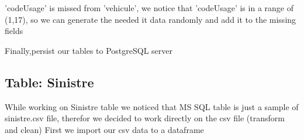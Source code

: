 'codeUsage' is missed from 'vehicule', we notice that 'codeUsage' is in a range of (1,17), so we can generate the needed it data randomly and add it to the missing fields
\begin{figure}[H]
\centering
{}
\end{figure}

Finally,persist our tables to PostgreSQL server
\begin{figure}[H]
\centering
{}
\end{figure}

\subsection{Table: Sinistre}

While working on Sinistre table we noticed that MS SQL table is just a sample of sinistre.csv file, therefor we decided to work directly on the csv file  (transform and clean)
\vskip0.2cm
First we import our csv data to a dataframe
\begin{figure}[H]
\centering
{}
\end{figure}

